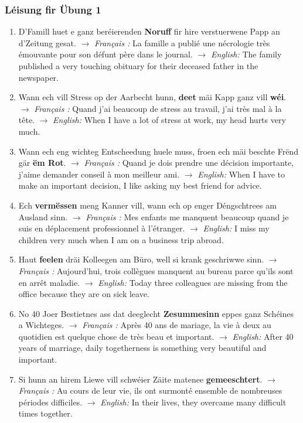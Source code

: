 \subsubsection*{Léisung fir Übung 1}
\begin{enumerate}
    \item D'Famill huet e ganz beréierenden \textbf{Noruff} fir hire verstuerwene Papp an d'Zeitung gesat.
    $\rightarrow$ \textit{Français :} La famille a publié une nécrologie très émouvante pour son défunt père dans le journal.
    $\rightarrow$ \textit{English:} The family published a very touching obituary for their deceased father in the newspaper.

    \item Wann ech vill Stress op der Aarbecht hunn, \textbf{deet} mäi Kapp ganz vill \textbf{wéi}.
    $\rightarrow$ \textit{Français :} Quand j'ai beaucoup de stress au travail, j'ai très mal à la tête.
    $\rightarrow$ \textit{English:} When I have a lot of stress at work, my head hurts very much.

    \item Wann ech eng wichteg Entscheedung huele muss, froen ech mäi beschte Frënd gär \textbf{ëm Rot}.
    $\rightarrow$ \textit{Français :} Quand je dois prendre une décision importante, j'aime demander conseil à mon meilleur ami.
    $\rightarrow$ \textit{English:} When I have to make an important decision, I like asking my best friend for advice.

    \item Ech \textbf{vermëssen} meng Kanner vill, wann ech op enger Déngschtrees am Ausland sinn.
    $\rightarrow$ \textit{Français :} Mes enfants me manquent beaucoup quand je suis en déplacement professionnel à l'étranger.
    $\rightarrow$ \textit{English:} I miss my children very much when I am on a business trip abroad.

    \item Haut \textbf{feelen} dräi Kolleegen am Büro, well si krank geschriwwe sinn.
    $\rightarrow$ \textit{Français :} Aujourd'hui, trois collègues manquent au bureau parce qu'ils sont en arrêt maladie.
    $\rightarrow$ \textit{English:} Today three colleagues are missing from the office because they are on sick leave.

    \item No 40 Joer Bestietnes ass dat deeglecht \textbf{Zesummesinn} eppes ganz Schéines a Wichteges.
    $\rightarrow$ \textit{Français :} Après 40 ans de mariage, la vie à deux au quotidien est quelque chose de très beau et important.
    $\rightarrow$ \textit{English:} After 40 years of marriage, daily togetherness is something very beautiful and important.

    \item Si hunn an hirem Liewe vill schwéier Zäite matenee \textbf{gemeeschtert}.
    $\rightarrow$ \textit{Français :} Au cours de leur vie, ils ont surmonté ensemble de nombreuses périodes difficiles.
    $\rightarrow$ \textit{English:} In their lives, they overcame many difficult times together.
\end{enumerate}

